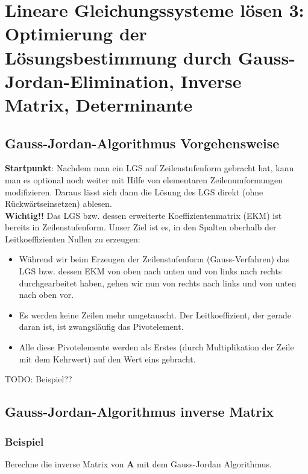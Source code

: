 \documentclass[../main.tex]{subfiles}
\begin{document}

\chapter{Lineare Gleichungssysteme lösen 3: Optimierung der Lösungsbestimmung durch Gauss-Jordan-Elimination, Inverse Matrix, Determinante}

\section{Gauss-Jordan-Algorithmus Vorgehensweise}
\textbf{Startpunkt}: Nachdem man ein LGS auf Zeilenstufenform gebracht hat, kann man es optional
noch weiter mit Hilfe von elementaren Zeilenumformungen modifizieren. Daraus lässt sich dann
die Lösung des LGS direkt (ohne Rückwärtseinsetzen) ablesen. \\

\textbf{Wichtig!!} Das LGS bzw. dessen erweiterte Koeffizientenmatrix (EKM) ist bereits in
Zeilenstufenform. Unser Ziel ist es, in den Spalten oberhalb der Leitkoeffizienten Nullen zu
erzeugen:

\begin{itemize}
    \item Während wir beim Erzeugen der Zeilenstufenform (Gauss-Verfahren) das LGS bzw. dessen
    EKM von oben nach unten und von links nach rechts durchgearbeitet haben, gehen wir
    nun von rechts nach links und von unten nach oben vor.
    \item Es werden keine Zeilen mehr umgetauscht. Der Leitkoeffizient, der gerade daran ist, ist
    zwangsläufig das Pivotelement.
    \item Alle diese Pivotelemente werden als Erstes (durch Multiplikation der Zeile mit dem
    Kehrwert) auf den Wert eins gebracht.
\end{itemize}

TODO: Beispiel??

\section{Gauss-Jordan-Algorithmus inverse Matrix}
\subsection{Beispiel}
Berechne die inverse Matrix von $\mathbf{A}$ mit dem Gauss-Jordan Algorithmus. \\
\end{document}
